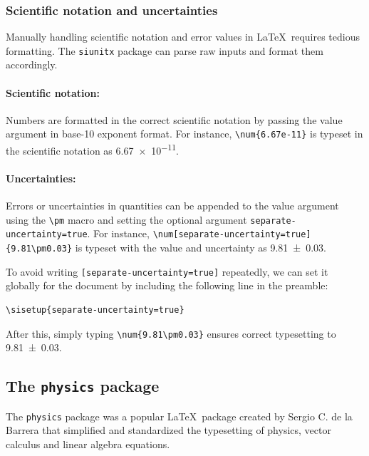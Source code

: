 		\subsubsection{Scientific notation and uncertainties}
			Manually handling scientific notation and error values in \LaTeX\ requires tedious formatting. The \lstinline|siunitx| package can parse raw inputs and format them accordingly.
			
			\paragraph{Scientific notation:} Numbers are formatted in the correct scientific notation by passing the value argument in base-10 exponent format. For instance, \lstinline|\num{6.67e-11}| is typeset in the scientific notation as \num{6.67e-11}.
			
			\paragraph{Uncertainties:} Errors or uncertainties in quantities can be appended to the value argument using the \lstinline|\pm| macro and setting the optional argument \lstinline|separate-uncertainty=true|. For instance, \lstinline|\num[separate-uncertainty=true]{9.81\pm0.03}| is typeset with the value and uncertainty as \num[separate-uncertainty=true]{9.81\pm0.03}.
			
			To avoid writing \lstinline|[separate-uncertainty=true]| repeatedly, we can set it globally for the document by including the following line in the preamble:
\begin{lstlisting}
\sisetup{separate-uncertainty=true}
\end{lstlisting}
			After this, simply typing \lstinline|\num{9.81\pm0.03}| ensures correct typesetting to \num{9.81\pm0.03}.
	
	\subsection{The \texttt{physics} package}
		The \lstinline|physics| package was a popular \LaTeX\ package created by Sergio C. de la Barrera that simplified and standardized the typesetting of physics, vector calculus and linear algebra equations. %
		
		
